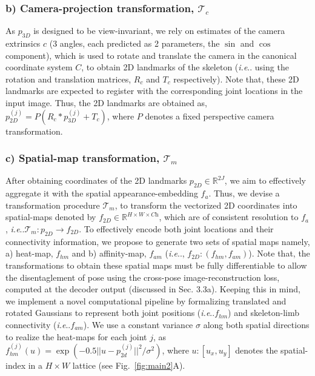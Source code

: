 \documentclass[letterpaper]{article} \usepackage{aaai20}  \usepackage{times}  \usepackage{helvet}  \usepackage{courier}  \usepackage{url}  \usepackage{graphicx}  \usepackage{amsmath}
\makeatletter
\DeclareRobustCommand\onedot{\futurelet\@let@token\@onedot}
\def\@onedot{\ifx\@let@token.\else.\null\fi\xspace}
\def\ie{\emph{i.e}\onedot} \def\Ie{\emph{I.e}\onedot}
\makeatother
\begin{document}
\subsubsection{b) Camera-projection transformation, $\mathcal{T}_{c}$} As $p_{3D}$ is designed to be view-invariant, we rely on estimates of the camera extrinsics $c$ (3 angles, each predicted as 2 parameters, the $\sin$ and $\cos$ component), which is used to rotate and translate the camera in the canonical coordinate system $C$, to obtain 2D landmarks of the skeleton (\ie using the rotation and translation matrices, $R_c$ and $T_c$ respectively). Note that, these 2D landmarks are expected to register with the corresponding joint locations in the input image. Thus, the 2D landmarks are obtained as, $p_{2D}^{(j)} = P(R_c*p_{3D}^{(j)}+T_c)$, where $P$ denotes a fixed perspective camera transformation.

\subsubsection{c) Spatial-map transformation, $\mathcal{T}_{m}$} 
After obtaining coordinates of the 2D landmarks $p_{2D}\in\mathbb{R}^{2J}$, we aim to effectively aggregate it with the spatial appearance-embedding $f_a$. Thus, we devise a transformation procedure $\mathcal{T}_{m}$, to transform the vectorized 2D coordinates into spatial-maps denoted by $f_{2D}\in \mathbb{R}^{H\times W\times \textit{Ch}}$, which are of consistent resolution to $f_a$, \ie $\mathcal{T}_m:p_{2D}\rightarrow f_{2D}$.
To effectively encode both joint locations and their connectivity information, we propose to generate two sets of spatial maps namely, a) heat-map, $f_{hm}$ and b) affinity-map, $f_{am}$ (\ie, $f_{2D}:(f_{hm},f_{am})$). Note that, the transformations to obtain these spatial maps must be fully differentiable to allow the disentaglement of pose using the cross-pose image-reconstruction loss, computed at the decoder output (discussed in Sec. {\color{red}3.3a}). Keeping this in mind, we implement a novel computational pipeline by formalizing translated and rotated Gaussians to represent both joint positions (\ie $f_{hm}$) and skeleton-limb connectivity (\ie $f_{am}$). We use a constant variance $\sigma$ along both spatial directions to realize the heat-maps for each joint $j$, as $f_{hm}^{(j)}(u) = \exp(-0.5||u-p_{2d}^{(j)}||^2/\sigma^{2})$, where $u:[u_x,u_y]$ 
denotes the spatial-index in a $H\times W$ lattice (see Fig.~\ref{fig:main2}A). 
\end{document}
